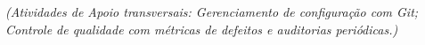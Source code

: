 \documentclass[12pt,a4paper]{article}
\begin{document}
\begin{tcolorbox}[respostabox]
\vspace{0.2cm}
\textit{(Atividades de Apoio transversais: Gerenciamento de configuração com Git; Controle de qualidade com métricas de defeitos e auditorias periódicas.)}
\end{tcolorbox}

\vspace{0.8cm}
\end{document}
